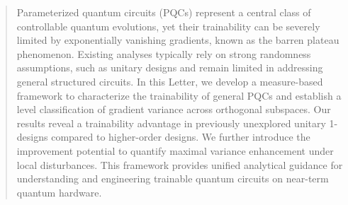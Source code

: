 \documentclass[%
 reprint,
 superscriptaddress,
 amsmath,amssymb,
 aps, prl, twocolumn, showpacs,
]{revtex4-2}
\begin{document}
\begin{abstract}

Parameterized quantum circuits (PQCs) represent a central class of controllable quantum evolutions, yet their trainability can be severely limited by exponentially vanishing gradients, known as the barren plateau phenomenon. Existing analyses typically rely on strong randomness assumptions, such as unitary designs and remain limited in addressing general structured circuits.
In this Letter, we develop a measure-based framework to characterize the trainability of general PQCs and establish a level classification of gradient variance across orthogonal subspaces. Our results reveal a trainability advantage in previously unexplored unitary 1-designs compared to higher-order designs. We further introduce the improvement potential to quantify maximal variance enhancement under local disturbances. This framework provides unified analytical guidance for understanding and engineering trainable quantum circuits on near-term quantum hardware.



\end{abstract}
\end{document}
